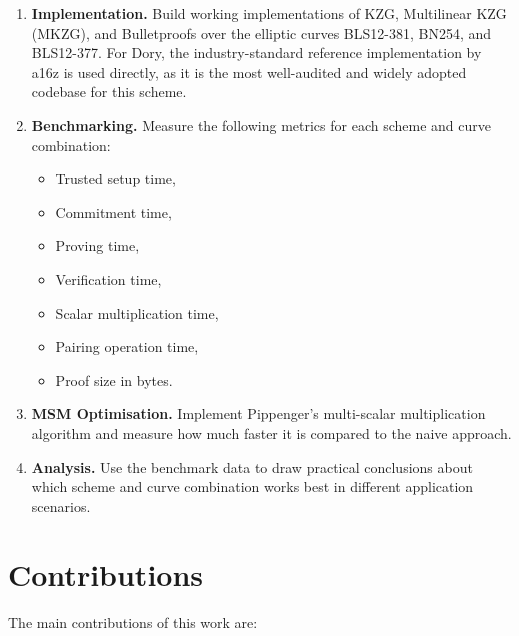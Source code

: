 \begin{enumerate}
    \item \textbf{Implementation.} Build working implementations of
          KZG, Multilinear KZG (MKZG), and Bulletproofs over the
          elliptic curves BLS12-381, BN254, and BLS12-377. For Dory,
          the industry-standard reference implementation by a16z
          \cite{a16z_dory} is used directly, as it is the most
          well-audited and widely adopted codebase for this scheme.
 
    \item \textbf{Benchmarking.} Measure the following metrics for
          each scheme and curve combination:
          \begin{itemize}
              \item Trusted setup time,
              \item Commitment time,
              \item Proving time,
              \item Verification time,
              \item Scalar multiplication time,
              \item Pairing operation time,
              \item Proof size in bytes.
          \end{itemize}
 
    \item \textbf{MSM Optimisation.} Implement Pippenger's
          multi-scalar multiplication algorithm and measure how much
          faster it is compared to the naive approach.
 
    \item \textbf{Analysis.} Use the benchmark data to draw practical
          conclusions about which scheme and curve combination works
          best in different application scenarios.
\end{enumerate}
 
\section{Contributions}
 
The main contributions of this work are:
 
